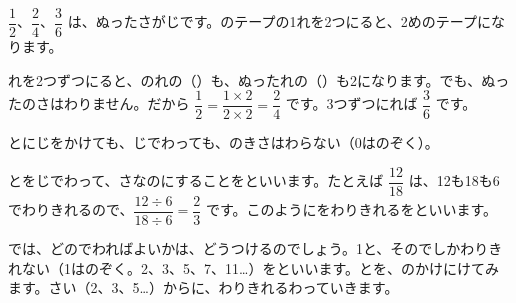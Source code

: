 \leavevmode\label{bk:2-4:yaku}\noindent\begin{minipage}[c]{0.52\linewidth}
\end{minipage}\hfill
\begin{minipage}[c]{0.45\linewidth}
$\dfrac{1}{2}$、$\dfrac{2}{4}$、$\dfrac{3}{6}$ は、ぬったさがじです。のテープの1れを2つにると、2めのテープになります。
\end{minipage}

\par\vspace{2pt}
れを2つずつにると、のれの（）も、ぬったれの（）も2になります。でも、ぬったのさはわりません。だから $\dfrac{1}{2}=\dfrac{1\times2}{2\times2}=\dfrac{2}{4}$ です。3つずつにれば $\dfrac{3}{6}$ です。
\begin{taisetsu}
とにじをかけても、じでわっても、のきさはわらない（0はのぞく）。
\end{taisetsu}

\textbf{}\quad {}とをじでわって、さなのにすることを\textbf{}といいます。たとえば $\dfrac{12}{18}$ は、12も18も6でわりきれるので、$\dfrac{12\div6}{18\div6}=\dfrac{2}{3}$ です。このようにをわりきれるを\textbf{}といいます。

では、どのでわればよいかは、どうつけるのでしょう。1と、そのでしかわりきれない（1はのぞく。2、3、5、7、11…）を\textbf{}といいます。とを、のかけにけてみます。さい（2、3、5…）からに、わりきれるわっていきます。

